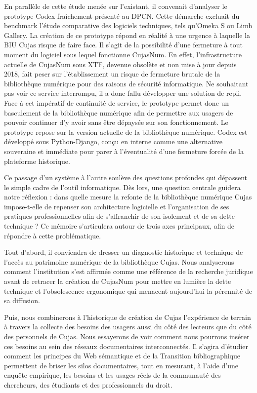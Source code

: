 En parallèle de cette étude menée sur l'existant, il convenait d'analyser le prototype Codex fraîchement présenté au DPCN. Cette démarche excluait du benchmark l'étude comparative des logiciels techniques, tels qu'Omeka S ou Limb Gallery. La création de ce prototype répond en réalité à une urgence à laquelle la BIU Cujas risque de faire face. Il s'agit de la possibilité d'une fermeture à tout moment du logiciel sous lequel fonctionne CujasNum. En effet, l'infrastructure actuelle de CujasNum sous XTF, devenue obsolète et non mise à jour depuis 2018, fait peser sur l'établissement un risque de fermeture brutale de la bibliothèque numérique pour des raisons de sécurité informatique. Ne souhaitant pas voir ce service interrompu, il a donc fallu développer une solution de repli. Face à cet impératif de continuité de service, le prototype permet donc un basculement de la bibliothèque numérique afin de permettre aux usagers de pouvoir continuer d'y avoir sans être dépaysée sur son fonctionnement. Le prototype repose sur la version actuelle de la bibliothèque numérique. Codex est développé sous Python-Django, conçu en interne comme une alternative souveraine et immédiate pour parer à l'éventualité d'une fermeture forcée de la plateforme historique.

\medskip
Ce passage d'un système à l'autre soulève des questions profondes qui dépassent le simple cadre de l'outil informatique. Dès lors, une question centrale guidera notre réflexion : dans quelle mesure la refonte de la bibliothèque numérique Cujas impose-t-elle de repenser son architecture logicielle et l'organisation de ses pratiques professionnelles afin de s'affranchir de son isolement et de sa dette technique ?
Ce mémoire s’articulera autour de trois axes principaux, afin de répondre à cette problématique.

Tout d'abord, il conviendra de dresser un diagnostic historique et technique de l’accès au patrimoine numérique de la bibliothèque Cujas. Nous analyserons comment l’institution s’est affirmée comme une référence de la recherche juridique avant de retracer la création de CujasNum pour mettre en lumière la dette technique et l'obsolescence ergonomique qui menacent aujourd’hui la pérennité de sa diffusion.

Puis, nous combinerons à l'historique de création  de Cujas l'expérience de terrain à travers la collecte des besoins des usagers aussi du côté des lecteurs que du côté des personnels de Cujas. Nous essayerons de voir comment nous pourrons insérer ces besoins au sein des réseaux documentaires interconnectés. Il s'agira d'étudier comment les principes du Web sémantique et de la Transition bibliographique permettent de briser les silos documentaires, tout en mesurant, à l'aide d'une enquête empirique, les besoins et les usages réels de la communauté des chercheurs, des étudiants et des professionnels du droit.

